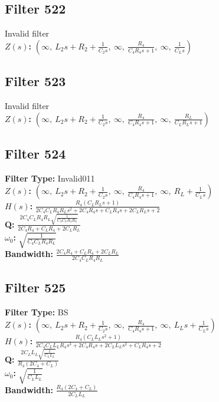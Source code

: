 \documentclass{article}
\begin{document}
\subsection*{Filter 522}
Invalid filter \\ 
\textbf{$Z(s)$:} $\left( \infty, \  L_{2} s + R_{2} + \frac{1}{C_{2} s}, \  \infty, \  \frac{R_{4}}{C_{4} R_{4} s + 1}, \  \infty, \  \frac{1}{C_{L} s}\right)$ \\ 
\subsection*{Filter 523}
Invalid filter \\ 
\textbf{$Z(s)$:} $\left( \infty, \  L_{2} s + R_{2} + \frac{1}{C_{2} s}, \  \infty, \  \frac{R_{4}}{C_{4} R_{4} s + 1}, \  \infty, \  \frac{R_{L}}{C_{L} R_{L} s + 1}\right)$ \\ 
\subsection*{Filter 524}
\textbf{Filter Type:} Invalid011 \\ 
\textbf{$Z(s)$:} $\left( \infty, \  L_{2} s + R_{2} + \frac{1}{C_{2} s}, \  \infty, \  \frac{R_{4}}{C_{4} R_{4} s + 1}, \  \infty, \  R_{L} + \frac{1}{C_{L} s}\right)$ \\ 
\textbf{$H(s)$:} $\frac{R_{4} \left(C_{L} R_{L} s + 1\right)}{2 C_{4} C_{L} R_{4} R_{L} s^{2} + 2 C_{4} R_{4} s + C_{L} R_{4} s + 2 C_{L} R_{L} s + 2}$ \\ 
\textbf{Q:} $\frac{2 C_{4} C_{L} R_{4} R_{L} \sqrt{\frac{1}{C_{4} C_{L} R_{4} R_{L}}}}{2 C_{4} R_{4} + C_{L} R_{4} + 2 C_{L} R_{L}}$ \\ 
\textbf{$\omega_0$:} $\sqrt{\frac{1}{C_{4} C_{L} R_{4} R_{L}}}$ \\ 
\textbf{Bandwidth:} $\frac{2 C_{4} R_{4} + C_{L} R_{4} + 2 C_{L} R_{L}}{2 C_{4} C_{L} R_{4} R_{L}}$ \\ 
\subsection*{Filter 525}
\textbf{Filter Type:} BS \\ 
\textbf{$Z(s)$:} $\left( \infty, \  L_{2} s + R_{2} + \frac{1}{C_{2} s}, \  \infty, \  \frac{R_{4}}{C_{4} R_{4} s + 1}, \  \infty, \  L_{L} s + \frac{1}{C_{L} s}\right)$ \\ 
\textbf{$H(s)$:} $\frac{R_{4} \left(C_{L} L_{L} s^{2} + 1\right)}{2 C_{4} C_{L} L_{L} R_{4} s^{3} + 2 C_{4} R_{4} s + 2 C_{L} L_{L} s^{2} + C_{L} R_{4} s + 2}$ \\ 
\textbf{Q:} $\frac{2 C_{L} L_{L} \sqrt{\frac{1}{C_{L} L_{L}}}}{R_{4} \left(2 C_{4} + C_{L}\right)}$ \\ 
\textbf{$\omega_0$:} $\sqrt{\frac{1}{C_{L} L_{L}}}$ \\ 
\textbf{Bandwidth:} $\frac{R_{4} \left(2 C_{4} + C_{L}\right)}{2 C_{L} L_{L}}$ \\ 
\end{document}

